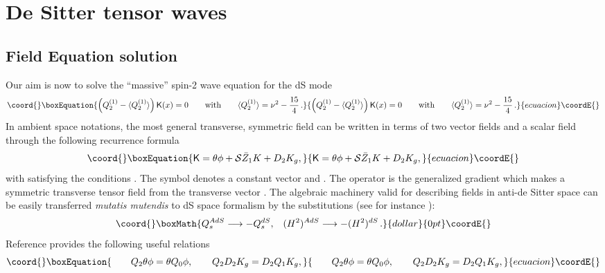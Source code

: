 \documentclass[a4paper,11pt,showpacs,preprintnumbers]{revtex4}
\def\K{\textsf{K}}
\begin{document}
\section{De Sitter tensor  waves}
\subsection{Field Equation solution}
Our aim is now to solve the ``massive'' spin-2 wave equation for
the dS  mode \myHighlight{$\K(x)$}\coordHE{}
\begin{equation}\coord{}\boxEquation{\label{eq:wave1}
\left(Q_2^{(1)}-\langle
Q_2^{(1)}\rangle\right)\K(x)=0\qquad\mbox{with}\qquad \langle
Q_2^{(1)}\rangle=\nu^{2}-{{15}\over{4}}\,.
}{\left(Q_2^{(1)}-\langle
Q_2^{(1)}\rangle\right)\K(x)=0\qquad\mbox{with}\qquad \langle
Q_2^{(1)}\rangle=\nu^{2}-{{15}\over{4}}\,.
}{ecuacion}\coordE{}\end{equation}
In ambient space  notations, the most general transverse,
symmetric field \myHighlight{$\K_{\alpha\beta}(x)$}\coordHE{} can be written in terms of
two vector fields \coordHE{} and a scalar field \myHighlight{$\phi$}\coordHE{} through the
following recurrence formula \cite{gaha}
\begin{equation}\coord{}\boxEquation{
\K=\theta\phi+{\cal S}\bar Z_1K+D_2K_g,
\label{eq:an}
}{
\K=\theta\phi+{\cal S}\bar Z_1K+D_2K_g,
}{ecuacion}\coordE{}\end{equation}
with \myHighlight{$\K$}\coordHE{} satisfying the conditions \myHighlight{$(\ref{eq:con2})$}\coordHE{}. The symbol
\coordHE{} denotes a constant vector and  \coordHE{}. The
operator \coordHE{} is the generalized gradient \coordHE{} which makes a symmetric transverse tensor field
from the transverse vector \coordHE{}. The algebraic machinery valid for
describing fields in anti-de Sitter space can be easily
transferred {\it mutatis mutendis} to dS space formalism by the
substitutions (see for instance \cite{gaha,fr,gazeau}):
$$\coord{}\boxMath{Q_s^{AdS}\longrightarrow -Q_s^{dS},  \;\;\;(H^2)^{AdS}\longrightarrow
-(H^2)^{dS}\, .}{dollar}{0pt}\coordE{}$$ Reference \cite{gazeau} provides the following
useful relations
\begin{equation}\coord{}\boxEquation{\label{eq:prop4}
\qquad Q_2\theta \phi=\theta Q_0\phi,\qquad
Q_2D_2K_{g}=D_2Q_1K_{g},\nonumber
}{\qquad Q_2\theta \phi=\theta Q_0\phi,\qquad
Q_2D_2K_{g}=D_2Q_1K_{g},\nonumber
}{ecuacion}\coordE{}\end{equation}
\end{document}
